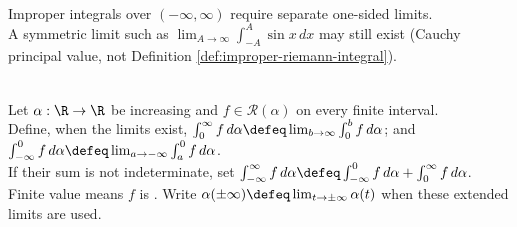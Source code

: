 \begin{perspective} \label{per:cauchy-principal-value-not-improper-integral} \\
Improper integrals over $(-\infty,\infty)$ require separate one-sided limits.\\
A symmetric limit such as $\lim_{A\to\infty}\int_{-A}^{A}\sin x\,dx$ may still exist (Cauchy principal value, not Definition \ref{def:improper-riemann-integral}).
\end{perspective}

\begin{definition} \label{def:improper-riemann-stieltjes-real-line} \\
Let $\alpha:\R\to\R$ be increasing and $f\in\mathcal{R}(\alpha)$ on every finite interval.\\
Define, when the limits exist, $\int_0^\infty f\,d\alpha\defeq\lim_{b\to\infty}\int_0^b f\,d\alpha$; and $\int_{-\infty}^{0} f\,d\alpha\defeq\lim_{a\to-\infty}\int_a^0 f\,d\alpha$.\\
If their sum is not indeterminate, set $\int_{-\infty}^{\infty}f\,d\alpha \defeq \int_{-\infty}^{0}f\,d\alpha+\int_0^\infty f\,d\alpha$.\\
Finite value means $f$ is . Write $\alpha(\pm\infty)\defeq\lim_{t\to\pm\infty}\alpha(t)$ when these extended limits are used.
\end{definition}

